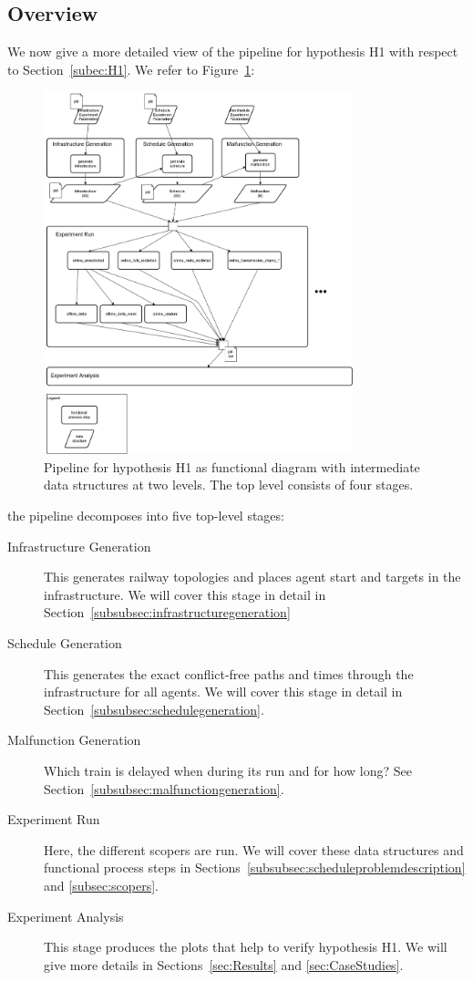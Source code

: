 \documentclass{article}
\begin{document}
\subsection{Overview}\label{subsubsec:H1overview}
We now give a more detailed view of the pipeline for hypothesis H1 with respect to Section~\ref{subec:H1}. We refer to Figure~\ref{fig:H1_overview}:
%
\begin{figure}[hbtp]
	\centering
  \includegraphics[width=0.8\textwidth]{Figures/03_pipeline/H1_overview.png}
	\caption{Pipeline for hypothesis H1 as functional diagram with intermediate data structures at two levels. The top level consists of four stages.}
	\label{fig:H1_overview}
\end{figure}
%
the pipeline decomposes into five top-level stages:
\begin{description}
\item[Infrastructure Generation] This generates railway topologies and places agent start and targets in the infrastructure. We will cover this stage in detail in Section~\ref{subsubsec:infrastructuregeneration}
\item[Schedule Generation] This generates the exact conflict-free paths and times through the infrastructure for all agents. We will cover this stage in detail in Section~\ref{subsubsec:schedulegeneration}.
\item[Malfunction Generation] Which train is delayed when during its run and for how long? See Section~\ref{subsubsec:malfunctiongeneration}.
\item[Experiment Run] Here, the different scopers are run. We will cover these data structures and functional process steps in Sections~\ref{subsubsec:scheduleproblemdescription} and \ref{subsec:scopers}.
\item[Experiment Analysis] This stage produces the plots that help to verify hypothesis H1. We will give more details in Sections~\ref{sec:Results} and \ref{sec:CaseStudies}.
\end{description}
\end{document}
